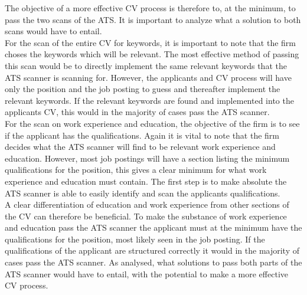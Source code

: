 The objective of a more effective CV process is therefore to, at the minimum, to pass the two scans of the ATS.
It is important to analyze what a solution to both scans would have to entail. \\
For the scan of the entire CV for keywords, it is important to note that the firm choses the keywords which will be relevant.
The most effective method of passing this scan would be to directly implement the same relevant keywords that the ATS scanner is scanning for.
However, the applicants and CV process will have only the position and the job posting to guess and thereafter implement the relevant keywords.
If the relevant keywords are found and implemented into the applicants CV, this would in the majority of cases pass the ATS scanner. \\

For the scan on work experience and education, the objective of the firm is to see if the applicant has the qualifications.
Again it is vital to note that the firm decides what the ATS scanner will find to be relevant work experience and education.
However, most job postings will have a section listing the minimum qualifications for the position, this gives a clear minimum for what work experience and education must contain.
The first step is to make absolute the ATS scanner is able to easily identify and scan the applicants qualifications. \\

A clear differentiation of education and work experience from other sections of the CV can therefore be beneficial.
To make the substance of work experience and education pass the ATS scanner the applicant must at the minimum have the qualifications for the position, most likely seen in the job posting.
If the qualifications of the applicant are structured correctly it would in the majority of cases pass the ATS scanner.
As analysed, what solutions to pass both parts of the ATS scanner would have to entail, with the potential to make a more effective CV process. \\


